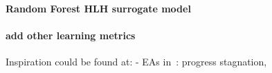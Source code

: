 \paragraph{Random Forest HLH surrogate model}

\paragraph{add other learning metrics}
Inspiration could be found at:
- EAs in~\cite{karafotias2014generic}: progress stagnation, 

